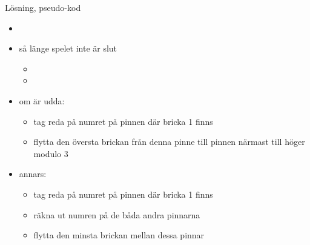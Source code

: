 \documentclass{lecturenotes}
\begin{document}
\begin{Slide}{Lösning, pseudo-kod}
\begin{itemize}
\item {}
\item så länge spelet inte är slut
\begin{itemize}
\item {}
\item {}
\end{itemize}
\end{itemize}

\begin{itemize}
\item om  är udda:
\begin{itemize}
	 \item tag reda på numret på pinnen där bricka 1 finns
	 \item flytta den översta brickan från denna pinne till
	  pinnen närmast till höger modulo 3
\end{itemize}
\item annars:
\begin{itemize}
	 \item tag reda på numret på pinnen där bricka 1 finns
	 \item räkna ut numren på de båda andra pinnarna
	 \item flytta den minsta brickan mellan dessa pinnar
\end{itemize}
\end{itemize}
\end{Slide} 
\end{document}

